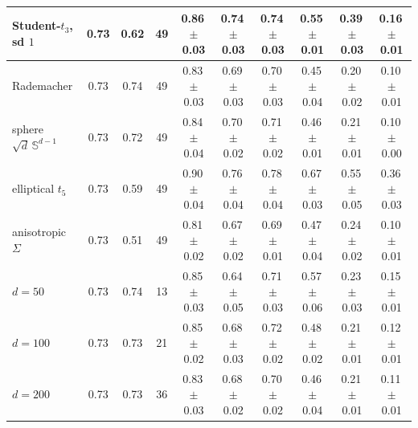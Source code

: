 \begin{tabular}{lccc|ccc|ccc}
Student-$t_3$, sd $1$ & 0.73 & 0.62 & 49 & 0.86\,{\scriptsize$\pm$0.03} & 0.74\,{\scriptsize$\pm$0.03} & 0.74\,{\scriptsize$\pm$0.03} & 0.55\,{\scriptsize$\pm$0.01} & 0.39\,{\scriptsize$\pm$0.03} & 0.16\,{\scriptsize$\pm$0.01} \\
\midrule
Rademacher & 0.73 & 0.74 & 49 & 0.83\,{\scriptsize$\pm$0.03} & 0.69\,{\scriptsize$\pm$0.03} & 0.70\,{\scriptsize$\pm$0.03} & 0.45\,{\scriptsize$\pm$0.04} & 0.20\,{\scriptsize$\pm$0.02} & 0.10\,{\scriptsize$\pm$0.01} \\
sphere $\sqrt{d}\,\mathbb{S}^{d-1}$ & 0.73 & 0.72 & 49 & 0.84\,{\scriptsize$\pm$0.04} & 0.70\,{\scriptsize$\pm$0.02} & 0.71\,{\scriptsize$\pm$0.02} & 0.46\,{\scriptsize$\pm$0.01} & 0.21\,{\scriptsize$\pm$0.01} & 0.10\,{\scriptsize$\pm$0.00} \\
elliptical $t_5$ & 0.73 & 0.59 & 49 & 0.90\,{\scriptsize$\pm$0.04} & 0.76\,{\scriptsize$\pm$0.04} & 0.78\,{\scriptsize$\pm$0.04} & 0.67\,{\scriptsize$\pm$0.03} & 0.55\,{\scriptsize$\pm$0.05} & 0.36\,{\scriptsize$\pm$0.03} \\
anisotropic $\Sigma$ & 0.73 & 0.51 & 49 & 0.81\,{\scriptsize$\pm$0.02} & 0.67\,{\scriptsize$\pm$0.02} & 0.69\,{\scriptsize$\pm$0.01} & 0.47\,{\scriptsize$\pm$0.04} & 0.24\,{\scriptsize$\pm$0.02} & 0.10\,{\scriptsize$\pm$0.01} \\
\midrule
$d=50$ & 0.73 & 0.74 & 13 & 0.85\,{\scriptsize$\pm$0.03} & 0.64\,{\scriptsize$\pm$0.05} & 0.71\,{\scriptsize$\pm$0.03} & 0.57\,{\scriptsize$\pm$0.06} & 0.23\,{\scriptsize$\pm$0.03} & 0.15\,{\scriptsize$\pm$0.01} \\
$d=100$ & 0.73 & 0.73 & 21 & 0.85\,{\scriptsize$\pm$0.02} & 0.68\,{\scriptsize$\pm$0.03} & 0.72\,{\scriptsize$\pm$0.02} & 0.48\,{\scriptsize$\pm$0.02} & 0.21\,{\scriptsize$\pm$0.01} & 0.12\,{\scriptsize$\pm$0.01} \\
$d=200$ & 0.73 & 0.73 & 36 & 0.83\,{\scriptsize$\pm$0.03} & 0.68\,{\scriptsize$\pm$0.02} & 0.70\,{\scriptsize$\pm$0.02} & 0.46\,{\scriptsize$\pm$0.04} & 0.21\,{\scriptsize$\pm$0.01} & 0.11\,{\scriptsize$\pm$0.01} \\
\bottomrule
\end{tabular}
